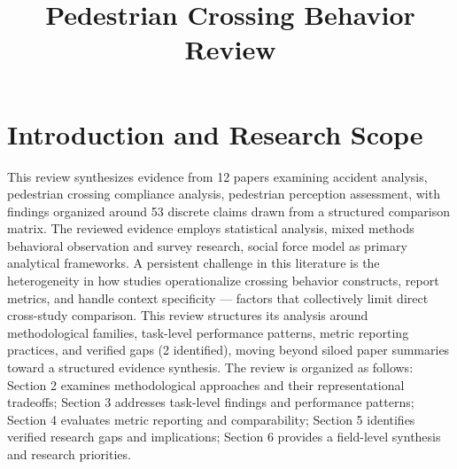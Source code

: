 \documentclass{article}
\title{Pedestrian Crossing Behavior Review}
\begin{document}
\maketitle
\section{Introduction and Research Scope}
This review synthesizes evidence from 12 papers examining accident analysis, pedestrian crossing compliance analysis, pedestrian perception assessment, with findings organized around 53 discrete claims drawn from a structured comparison matrix. The reviewed evidence employs statistical analysis, mixed methods behavioral observation and survey research, social force model as primary analytical frameworks. A persistent challenge in this literature is the heterogeneity in how studies operationalize crossing behavior constructs, report metrics, and handle context specificity — factors that collectively limit direct cross-study comparison. This review structures its analysis around methodological families, task-level performance patterns, metric reporting practices, and verified gaps (2 identified), moving beyond siloed paper summaries toward a structured evidence synthesis. The review is organized as follows: Section 2 examines methodological approaches and their representational tradeoffs; Section 3 addresses task-level findings and performance patterns; Section 4 evaluates metric reporting and comparability; Section 5 identifies verified research gaps and implications; Section 6 provides a field-level synthesis and research priorities.
\end{document}
